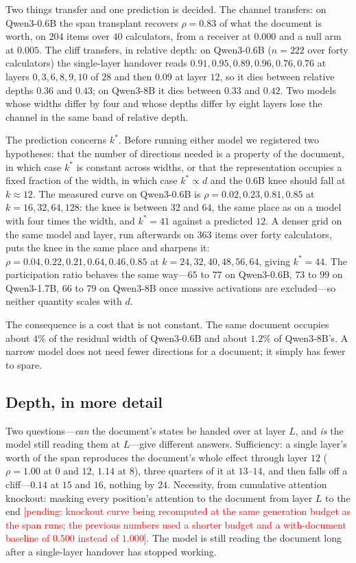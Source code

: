 \documentclass{article}
\newcommand{\PEND}[1]{\textcolor{red}{[pending: #1]}}
\begin{document}
Two things transfer and one prediction is decided. The channel transfers: on
Qwen3-0.6B the span transplant recovers $\rho = 0.83$ of what the document is
worth, on $204$ items over $40$ calculators, from a receiver at $0.000$ and a
null arm at $0.005$. The cliff transfers, in relative depth: on Qwen3-0.6B
($n=222$ over forty calculators) the single-layer handover reads
$0.91, 0.95, 0.89, 0.96, 0.76, 0.76$ at layers $0,3,6,8,9,10$ of $28$ and then
$0.09$ at layer $12$, so it dies between relative depths $0.36$ and $0.43$; on
Qwen3-8B it dies between $0.33$ and $0.42$. Two models whose widths differ by
four and whose depths differ by eight layers lose the channel in the same
band of relative depth.

The prediction concerns $k^{*}$. Before running either model we registered two
hypotheses: that the number of directions needed is a property of the document,
in which case $k^{*}$ is constant across widths, or that the representation
occupies a fixed fraction of the width, in which case $k^{*}\propto d$ and the
$0.6$B knee should fall at $k\approx12$. The measured curve on Qwen3-0.6B is
$\rho = 0.02, 0.23, 0.81, 0.85$ at $k = 16, 32, 64, 128$: the knee is between
$32$ and $64$, the same place as on a model with four times the width, and
$k^{*}=41$ against a predicted $12$. A denser grid on the same model and layer,
run afterwards on $363$ items over forty calculators, puts the knee in the same
place and sharpens it: $\rho = 0.04, 0.22, 0.21, 0.64, 0.46, 0.85$ at
$k = 24, 32, 40, 48, 56, 64$, giving $k^{*}=44$. The participation ratio behaves the
same way---$65$ to $77$ on Qwen3-0.6B, $73$ to $99$ on Qwen3-1.7B, $66$ to $79$
on Qwen3-8B once massive activations are excluded---so neither quantity scales
with $d$.

The consequence is a cost that is not constant. The same document occupies
about $4\%$ of the residual width of Qwen3-0.6B and about $1.2\%$ of Qwen3-8B's.
A narrow model does not need fewer directions for a document; it simply has
fewer to spare.

\subsection{Depth, in more detail}
\label{app:depth2}

Two questions---\emph{can} the document's states be handed over at layer $L$,
and \emph{is} the model still reading them at $L$---give different answers.
Sufficiency: a single layer's worth of the span reproduces the document's whole
effect through layer $12$ ($\rho = 1.00$ at $0$ and $12$, $1.14$ at $8$), three
quarters of it at $13$--$14$, and then falls off a cliff---$0.14$ at $15$ and
$16$, nothing by $24$. Necessity, from cumulative attention knockout: masking
every position's attention to the document from layer $L$ to the end
\PEND{knockout curve being recomputed at the same generation budget as the span
runs; the previous numbers used a shorter budget and a with-document baseline of
$0.500$ instead of $1.000$}. The model is still reading the document long after
a single-layer handover has stopped working.
\end{document}
